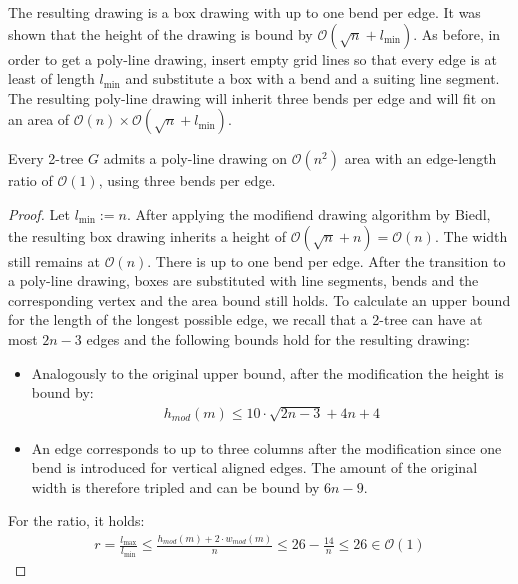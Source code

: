 The resulting drawing is a box drawing with up to one bend per edge. It was shown that the height of the drawing is bound by $\mathcal{O}(\sqrt{n}+l_{\min})$. As before, in order to get a poly-line drawing, insert empty grid lines so that every edge is at least of length $l_{\min}$ and substitute a box with a bend and a suiting line segment. The resulting poly-line drawing will inherit three bends per edge and will fit on an area of $\mathcal{O}(n)\times \mathcal{O}(\sqrt{n}+l_{\min})$.\bigskip\\

\begin{theorem}\label{theorem:2-tree_result}
	Every 2-tree $G$ admits a poly-line drawing on $\mathcal{O}(n^2)$ area with an edge-length ratio of $\mathcal{O}(1)$, using three bends per edge.
\end{theorem}
\begin{proof}
	Let $l_{\min} := n$. After applying the modifiend drawing algorithm by Biedl, the resulting box drawing inherits a height of $\mathcal{O}(\sqrt{n}+n) = \mathcal{O}(n)$. The width still remains at $\mathcal{O}(n)$. There is up to one bend per edge. After the transition to a poly-line drawing, boxes are substituted with line segments, bends and the corresponding vertex and the area bound still holds. To calculate an upper bound for the length of the longest possible edge, we recall that a 2-tree can have at most $2n-3$ edges and the following bounds hold for the resulting drawing:
	\begin{itemize}
		\item Analogously to the original upper bound, after the modification the height is bound by:
		\begin{align}
			h_{mod}(m) \leq 10\cdot\sqrt{2n-3}+4n+4
		\end{align}
	\item An edge corresponds to up to three columns after the modification since one bend is introduced for vertical aligned edges. The amount of the original width is therefore tripled and can be bound by $6n-9$. 
	\end{itemize}
For the ratio, it holds:
\begin{align}
	r = \frac{l_{\max}}{l_{\min}} \leq \frac{h_{mod}(m)+2\cdot w_{mod}(m)}{n} \leq 26 -\frac{14}{n} \leq 26\in\mathcal{O}(1)
\end{align}
\end{proof}